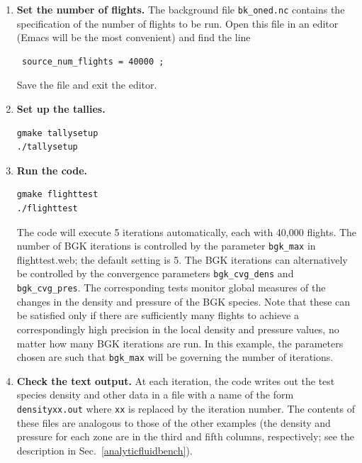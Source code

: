 \documentclass[12pt]{report}
\begin{document}
\begin{enumerate}
  \item {\bf Set the number of flights.} The background file {\tt bk\_oned.nc}
contains the specification of the number of flights to be run. Open this
file in an editor (Emacs will be the most convenient) and find the line
\begin{verbatim}
 source_num_flights = 40000 ;
\end{verbatim}
Save the file and exit the editor.
  \item {\bf Set up the tallies.} 
\begin{verbatim}
gmake tallysetup
./tallysetup
\end{verbatim}
  \item {\bf Run the code.}
\begin{verbatim}
gmake flighttest
./flighttest
\end{verbatim}
The code will execute 5 iterations automatically, each with 40,000 flights.
The number of BGK iterations is controlled
by the parameter \verb+bgk_max+ in flighttest.web; the default setting is 5. The
BGK iterations can alternatively be controlled by the convergence parameters
\verb+bgk_cvg_dens+ and \verb+bgk_cvg_pres+. 
The corresponding tests monitor global measures
of the changes in the density and pressure of the BGK species. Note that
these can be satisfied only if there are sufficiently many flights
to achieve a correspondingly high precision in the local density and
pressure values, no matter how many BGK iterations are run. In this example,
the parameters chosen are such that
\verb+bgk_max+ will be governing the number of iterations.

  \item {\bf Check the text output.} At each iteration, the code writes out the 
test species density and other data in a file with a name of the form
{\tt densityxx.out} where {\tt xx}
is replaced by the iteration number. 
The contents of these files are analogous to those of the other examples
(the density and pressure for each zone are in the third and fifth
columns, respectively; 
see the description in Sec.~\ref{analyticfluidbench}).


\end{enumerate}
\end{document}
